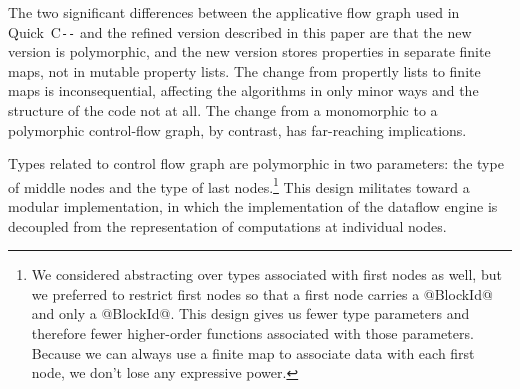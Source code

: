 \documentclass[blockstyle,preprint,nocopyrightspace]{sigplanconf}
\let\cite\citep
\newcommand\PAL{\mbox{C{\texttt{-{}-}}}}
\begin{document}
The two significant differences between the applicative flow graph
used in Quick~{\PAL} \cite{dias-ramsey:applicative-flow-graph} and the
refined version described in this paper are that the new version is
polymorphic, and the new version stores properties in separate finite
maps, not in mutable property lists.
The change from propertly lists to finite maps is inconsequential,
affecting the algorithms in only minor ways and the structure of the
code not at all.
The change from a monomorphic to a polymorphic control-flow graph, by
contrast, has far-reaching implications.

Types related to control flow graph are polymorphic in two parameters:
the type of middle nodes and the type of last nodes.\footnote
{We considered abstracting over types associated with first nodes as
  well, but we preferred to restrict first nodes so that a first node
  carries a @BlockId@ and only a @BlockId@.
  This design gives us fewer type parameters and
  therefore fewer higher-order functions associated with those
  parameters.
  Because we can always use a finite map to associate data with
  each first node, we don't lose any expressive power.}
This design militates toward a modular implementation,
in which the implementation of the dataflow engine is 
decoupled from the representation of computations at individual nodes.
\end{document}
